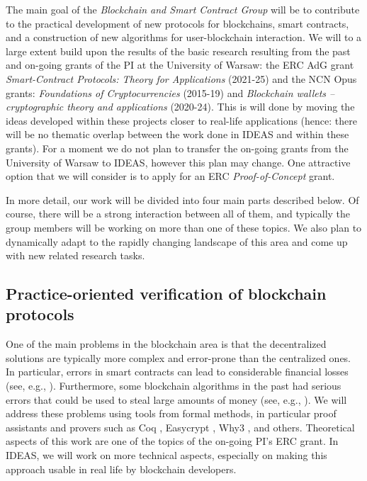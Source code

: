 \documentclass{article}
\begin{document}
The main goal of the \emph{Blockchain and Smart Contract Group} will be to contribute to the practical development of new protocols for blockchains, smart contracts, and a construction of new algorithms for user-blockchain interaction. 
We will to a large extent build upon the results of the basic research resulting from the past and on-going grants of the PI at the University of Warsaw: the ERC AdG grant \emph{Smart-Contract Protocols: Theory for Applications} (2021-25) and the NCN Opus grants: \emph{Foundations of Cryptocurrencies} (2015-19) and \emph{Blockchain wallets -- cryptographic theory and applications} (2020-24). This is will done by moving the ideas developed within these projects closer to real-life applications (hence: there will be no thematic overlap between the work done in IDEAS and within these grants). For a moment we do not plan to transfer the on-going grants from the University of Warsaw to IDEAS, however this plan may change. One attractive option that we will consider is to apply for an ERC \emph{Proof-of-Concept} grant.

In more detail, our work will be divided into four main parts described below. Of course, there will be a strong interaction between all of them, and typically the group members will be working on more than one of these topics. We also plan to dynamically adapt to the rapidly changing landscape of this area and come up with new related research tasks.




\subsection{Practice-oriented verification of blockchain protocols}\label{sec:verif}

One of the main problems in the blockchain area is that the decentralized solutions are typically more complex and error-prone than the centralized ones. In particular, errors in smart contracts can lead to considerable financial losses (see, e.g., \cite{DAO}). Furthermore, some blockchain algorithms in the past had serious errors that could be used to steal large amounts of money (see, e.g., \cite{HACKETT}).  We will address these problems using tools from formal methods, in particular proof assistants and provers such as Coq \cite{Chlipala2013}, Easycrypt \cite{Barthe2013}, Why3 \cite{Santos2015}, and others. Theoretical aspects of this work are one of the topics of the on-going PI's ERC grant. In IDEAS, we will work on more technical aspects, especially on making this approach usable in real life by blockchain developers.
\end{document}

